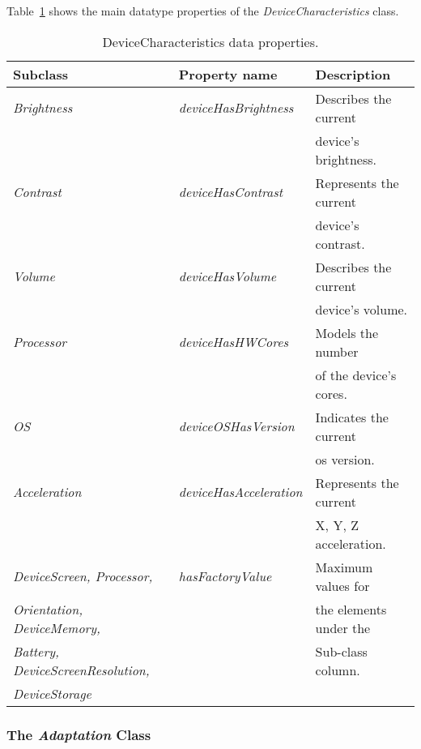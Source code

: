 Table~\ref{tbl:device_characteristics_ontology} shows the main datatype properties
of the \textit{DeviceCharacteristics} class.


\begin{table}
  \caption{DeviceCharacteristics data properties.}
 \label{tbl:device_characteristics_ontology}
\footnotesize
\centering
 \begin{tabular}{l l l}
  \hline 
  \textbf{Subclass} 	& \textbf{Property name} 	& \textbf{Description}		\\
  \hline
  \textit{Brightness}	& \textit{deviceHasBrightness}	& Describes the current		\\
			& 				& device's brightness.		\\
  \textit{Contrast}	& \textit{deviceHasContrast}	& Represents the current 	\\
  			& 				& device's contrast.		\\
  \textit{Volume}	& \textit{deviceHasVolume}	& Describes the current		\\
   			& 				& device's volume.		\\
  \textit{Processor}	& \textit{deviceHasHWCores}	& Models the number 		\\
			& 				& of the device's cores.	\\
  \textit{OS}		& \textit{deviceOSHasVersion}	& Indicates the current		\\
			& 				& \ac{os} version.		\\
  \textit{Acceleration}	& \textit{deviceHasAcceleration}& Represents the current 	\\
			& 				& X, Y, Z acceleration.		\\
  \textit{DeviceScreen,	Processor,}& \textit{hasFactoryValue}& Maximum values for 	\\
\textit{Orientation, DeviceMemory,}& 			& the elements under the  	\\
\textit{Battery, DeviceScreenResolution,} & 		& Sub-class column.  		\\
\textit{DeviceStorage} 	& 				& 				\\
  \hline

\end{tabular}
\end{table}


\subsubsection{The \textit{Adaptation} Class}
\label{sec:adaptation_class}

